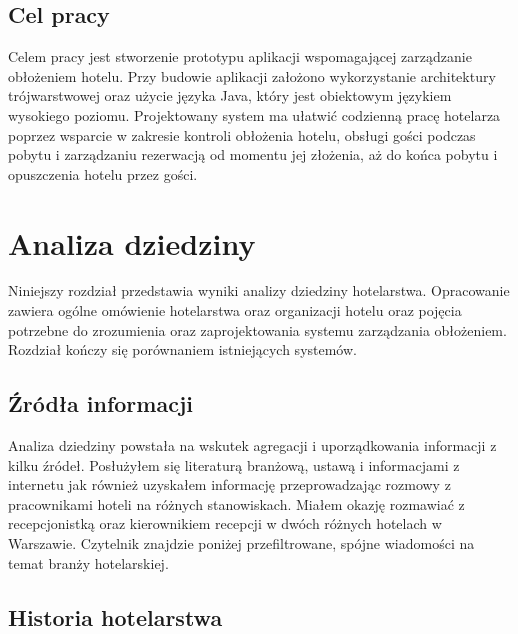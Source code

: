 \documentclass[a4paper,onecolumn,oneside,11pt,wide,floatssmall]{mwrep}
\theoremstyle{definition}
\theoremstyle{plain}%
\theoremstyle{remark}
\begin{document}
\section{Cel pracy}
Celem pracy jest stworzenie prototypu aplikacji wspomagającej zarządzanie obłożeniem hotelu. 
Przy budowie aplikacji założono wykorzystanie architektury trójwarstwowej oraz użycie języka Java, który jest obiektowym językiem wysokiego poziomu. 
Projektowany system ma ułatwić codzienną pracę hotelarza poprzez wsparcie w zakresie kontroli obłożenia hotelu, obsługi gości podczas pobytu i zarządzaniu rezerwacją od momentu jej złożenia, aż do końca pobytu i opuszczenia hotelu przez gości.




\chapter{Analiza dziedziny} 
\label{analiza-dziedziny}
Niniejszy rozdział przedstawia wyniki analizy dziedziny hotelarstwa. Opracowanie zawiera ogólne omówienie hotelarstwa oraz organizacji hotelu oraz pojęcia potrzebne do zrozumienia oraz zaprojektowania systemu zarządzania obłożeniem. Rozdział kończy się porównaniem istniejących systemów.

\section{Źródła informacji}

Analiza dziedziny powstała na wskutek agregacji i uporządkowania informacji 
z kilku źródeł. Posłużyłem się literaturą branżową, ustawą i informacjami z 
internetu jak również uzyskałem informację przeprowadzając rozmowy z 
pracownikami hoteli na różnych stanowiskach. Miałem okazję rozmawiać z 
recepcjonistką oraz kierownikiem recepcji w dwóch różnych hotelach w 
Warszawie. Czytelnik znajdzie poniżej przefiltrowane, spójne wiadomości na
 temat branży hotelarskiej.


\section{Historia hotelarstwa} 
\end{document}
